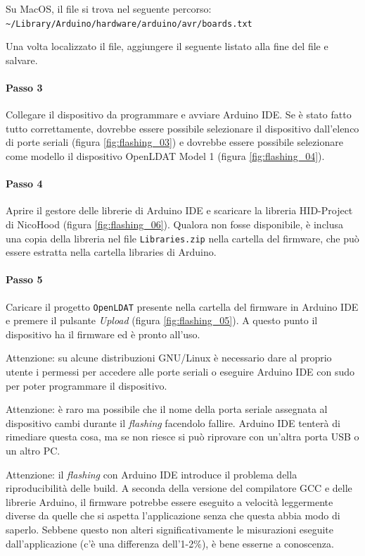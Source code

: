 Su MacOS, il file si trova nel seguente percorso:\\
	\texttt{\textasciitilde/Library/Arduino/hardware/arduino/avr/boards.txt}

Una volta localizzato il file, aggiungere il seguente listato alla fine del file e salvare.


\paragraph{Passo 3} Collegare il dispositivo da programmare e avviare Arduino IDE. Se è stato fatto tutto correttamente, dovrebbe essere possibile selezionare il dispositivo dall'elenco di porte seriali (figura \ref{fig:flashing_03}) e dovrebbe essere possibile selezionare come modello il dispositivo OpenLDAT Model 1 (figura \ref{fig:flashing_04}).

\paragraph{Passo 4} Aprire il gestore delle librerie di Arduino IDE e scaricare la libreria HID-Project di NicoHood (figura \ref{fig:flashing_06}). Qualora non fosse disponibile, è inclusa una copia della libreria nel file \texttt{Libraries.zip} nella cartella del firmware, che può essere estratta nella cartella libraries di Arduino.

\paragraph{Passo 5} Caricare il progetto \texttt{OpenLDAT} presente nella cartella del firmware in Arduino IDE e premere il pulsante \textit{Upload} (figura \ref{fig:flashing_05}). A questo punto il dispositivo ha il firmware ed è pronto all'uso.

Attenzione: su alcune distribuzioni GNU/Linux è necessario dare al proprio utente i permessi per accedere alle porte seriali o eseguire Arduino IDE con sudo per poter programmare il dispositivo.

Attenzione: è raro ma possibile che il nome della porta seriale assegnata al dispositivo cambi durante il \textit{flashing} facendolo fallire. Arduino IDE tenterà di rimediare questa cosa, ma se non riesce si può riprovare con un'altra porta USB o un altro PC.

Attenzione: il \textit{flashing} con Arduino IDE introduce il problema della riproducibilità delle build. A seconda della versione del compilatore GCC e delle librerie Arduino, il firmware potrebbe essere eseguito a velocità leggermente diverse da quelle che si aspetta l'applicazione senza che questa abbia modo di saperlo. Sebbene questo non alteri significativamente le misurazioni eseguite dall'applicazione (c'è una differenza dell'1-2\%), è bene esserne a conoscenza.

